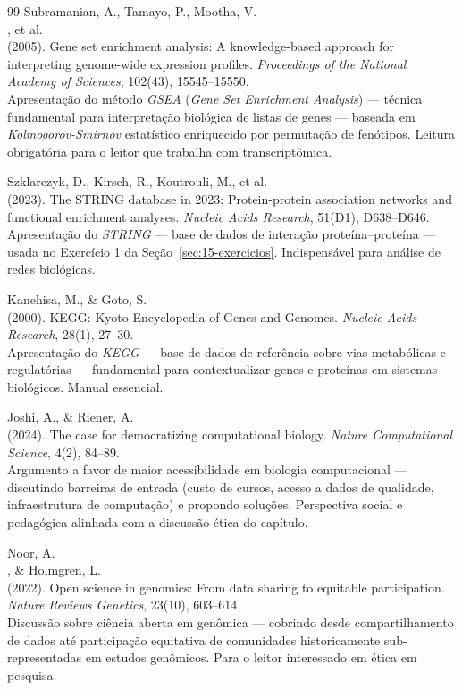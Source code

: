 \begin{thebibliography}{99}
 Subramanian, A., Tamayo, P., Mootha, V.\\, et al.\\ (2005). Gene set enrichment analysis: A knowledge-based approach for interpreting genome-wide expression profiles. \emph{Proceedings of the National Academy of Sciences}, 102(43), 15545--15550.\\ Apresentação do método \emph{GSEA} (\emph{Gene Set Enrichment Analysis}) --- técnica fundamental para interpretação biológica de listas de genes --- baseada em \emph{Kolmogorov-Smirnov} estatístico enriquecido por permutação de fenótipos. Leitura obrigatória para o leitor que trabalha com transcriptômica.

 Szklarczyk, D., Kirsch, R., Koutrouli, M., et al.\\ (2023). The STRING database in 2023: Protein-protein association networks and functional enrichment analyses. \emph{Nucleic Acids Research}, 51(D1), D638--D646.\\ Apresentação do \emph{STRING} --- base de dados de interação proteína--proteína --- usada no Exercício 1 da Seção~\ref{sec:15-exercicios}. Indispensável para análise de redes biológicas.

 Kanehisa, M., \& Goto, S.\\ (2000). KEGG: Kyoto Encyclopedia of Genes and Genomes. \emph{Nucleic Acids Research}, 28(1), 27--30.\\ Apresentação do \emph{KEGG} --- base de dados de referência sobre vias metabólicas e regulatórias --- fundamental para contextualizar genes e proteínas em sistemas biológicos. Manual essencial.

 Joshi, A., \& Riener, A.\\ (2024). The case for democratizing computational biology. \emph{Nature Computational Science}, 4(2), 84--89.\\ Argumento a favor de maior acessibilidade em biologia computacional --- discutindo barreiras de entrada (custo de cursos, acesso a dados de qualidade, infraestrutura de computação) e propondo soluções. Perspectiva social e pedagógica alinhada com a discussão ética do capítulo.

 Noor, A.\\, \& Holmgren, L.\\ (2022). Open science in genomics: From data sharing to equitable participation. \emph{Nature Reviews Genetics}, 23(10), 603--614.\\ Discussão sobre ciência aberta em genômica --- cobrindo desde compartilhamento de dados até participação equitativa de comunidades historicamente sub-representadas em estudos genômicos. Para o leitor interessado em ética em pesquisa.


\end{thebibliography}
